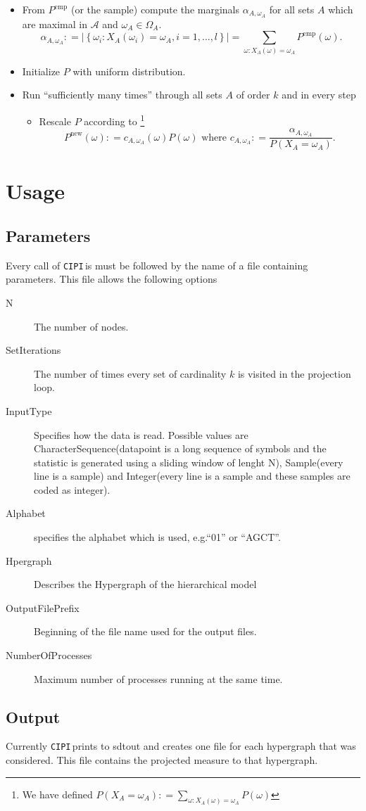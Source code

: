 \documentclass[12pt]{amsart}
\newcommand{\set}[1]{\left\lbrace #1 \right\rbrace} %
\newcommand{\defas}{\mathrel{\mathop{:}}=}   %
\providecommand{\abs}[1]{\left\lvert#1\right\rvert}
\newcommand{\eg}{e.g.\;}  %
\newcommand{\cipi}{\texttt{CIPI}\,}
\theoremstyle{plain}%
\theoremstyle{definition}
\theoremstyle{remark}
\begin{document}
\begin{itemize}
\item From $P^{\text{emp}}$ (or the sample) compute the marginals
  $\alpha_{A,\omega_A}$ for all sets $A$ which are maximal in $\mathcal{A}$ and 
  $\omega_A \in \Omega_A$.
  \begin{equation*}
    \alpha_{A,\omega_A} \defas \abs{\set{\omega_i : X_A(\omega_i)
        = \omega_A, i=1,\ldots,l}} = \sum_{\omega : X_A(\omega) = \omega_A}P^{\text{emp}}(\omega).
  \end{equation*}
\item Initialize $P$ with uniform distribution.
\item Run ``sufficiently many times'' through all sets $A$ of order
  $k$ and in every step
  \begin{itemize}
  \item Rescale $P$ according to \footnote{We have defined
      $P(X_A=\omega_A) \defas \sum_{\omega: X_A(\omega) = \omega_A}
      P(\omega)$}
    \begin{equation*}
      P^{\text{new}}(\omega) \defas c_{A,\omega_A}(\omega) P(\omega) \text{ where } c_{A,\omega_A} \defas \frac{\alpha_{A,\omega_A}}{P(X_A = \omega_A)}.
    \end{equation*}
  \end{itemize}
\end{itemize}


\section{Usage}
\label{sec:usage}
\subsection{Parameters}
Every call of \cipi is must be followed by the name of a file containing
parameters. This file allows the following options
\begin{description}
  \item[N] The number of nodes.
  \item[SetIterations] The number of times every set of cardinality $k$ is
    visited in the projection loop.
  \item[InputType] Specifies how the data is read. Possible values are CharacterSequence(datapoint is a long sequence of symbols and the
    statistic is generated using a sliding window of lenght N), Sample(every line is a sample) and Integer(every line is a sample and these samples are coded as integer). 
  \item[Alphabet] specifies the alphabet which is used, \eg ``01'' or
    ``AGCT''. 
  \item[Hpergraph] Describes the Hypergraph of the hierarchical model
  \item[OutputFilePrefix] Beginning of the file name used for the output files. 
  \item[NumberOfProcesses] Maximum number of processes running at the same time. 
\end{description}

\subsection{Output}
Currently \cipi prints to sdtout and creates one file for each hypergraph that
was considered. This file contains the projected measure to that hypergraph.



\end{document}
